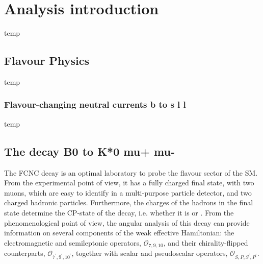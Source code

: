 \chapter{Analysis introduction}
\label{sec:theo}

temp

\section{Flavour Physics}
\label{sec:flav}

temp

\subsection{Flavour-changing neutral currents b to s l l}
\label{sec:FCNC}

temp

\section{The decay B0 to K*0 mu+ mu-}
\label{sec:Kstmm}


The FCNC decay \BtoKstmumudecay is an optimal laboratory to probe the flavour sector of the SM.
From the experimental point of view, it has a fully charged final state, with two muons, which are easy to identify in a multi-purpose particle detector, and two charged hadronic particles.
Furthermore, the charges of the hadrons in the final state determine the CP-state of the decay, i.e. whether it is \BtoKstmumudecay or \BtoKstmumuconjdecay.
From the phenomenological point of view, the angular analysis of this decay can provide information on several components of the weak effective Hamiltonian: the electromagnetic and semileptonic operators, $\mathcal{O}_{7,9,10}$, and their chirality-flipped counterparts, $\mathcal{O}_{7^\prime,9^\prime,10^\prime}$, together with scalar and pseudoscalar operators, $\mathcal{O}_{S,P,S^\prime,P^\prime}$.


